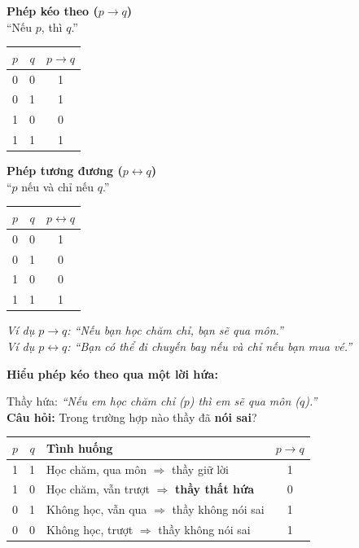 \documentclass[12pt,a4paper]{article}
\begin{document}
\noindent
\begin{minipage}[t]{0.48\textwidth}
\textbf{Phép kéo theo ($p \to q$)}\\
``Nếu $p$, thì $q$.''

\begin{center}
\renewcommand{\arraystretch}{1.2}
\begin{tabular}{|c|c|c|}
\hline
$p$ & $q$ & $p \to q$ \\ \hline
0 & 0 & 1 \\ \hline
0 & 1 & 1 \\ \hline
1 & 0 & 0 \\ \hline
1 & 1 & 1 \\ \hline
\end{tabular}
\end{center}
\end{minipage}
\hfill
\begin{minipage}[t]{0.48\textwidth}
\textbf{Phép tương đương ($p \leftrightarrow q$)}\\
``$p$ nếu và chỉ nếu $q$.''

\begin{center}
\renewcommand{\arraystretch}{1.2}
\begin{tabular}{|c|c|c|}
\hline
$p$ & $q$ & $p \leftrightarrow q$ \\ \hline
0 & 0 & 1 \\ \hline
0 & 1 & 0 \\ \hline
1 & 0 & 0 \\ \hline
1 & 1 & 1 \\ \hline
\end{tabular}
\end{center}
\end{minipage}

\vspace{4pt}
\textit{Ví dụ $p \to q$: ``Nếu bạn học chăm chỉ, bạn sẽ qua môn.''}\\
\textit{Ví dụ $p \leftrightarrow q$: ``Bạn có thể đi chuyến bay nếu và chỉ nếu bạn mua vé.''}

\textbf{Hiểu phép kéo theo qua một lời hứa:}

Thầy hứa: \textit{``Nếu em học chăm chỉ ($p$) thì em sẽ qua môn ($q$).''}\\
\textbf{Câu hỏi:} Trong trường hợp nào thầy đã \textbf{nói sai}?

\begin{center}
\renewcommand{\arraystretch}{1.25}
\begin{tabular}{cclc}
\toprule
$p$ & $q$ & \textbf{Tình huống} & $p \to q$ \\
\midrule
1 & 1 & Học chăm, qua môn $\Rightarrow$ thầy giữ lời & 1 \\
1 & 0 & Học chăm, vẫn trượt $\Rightarrow$ \textcolor{AccentRed}{\textbf{thầy thất hứa}} & \textcolor{AccentRed}{0} \\
0 & 1 & Không học, vẫn qua $\Rightarrow$ thầy không nói sai & 1 \\
0 & 0 & Không học, trượt $\Rightarrow$ thầy không nói sai & 1 \\
\bottomrule
\end{tabular}
\end{center}
\end{document}
